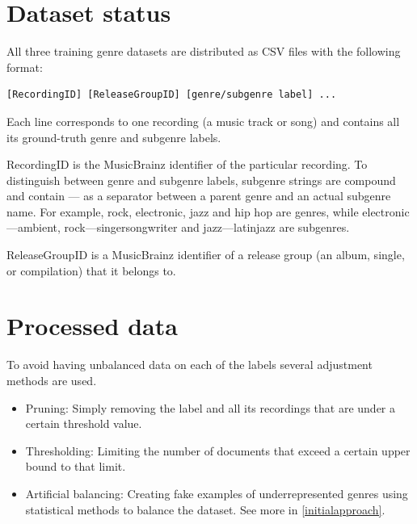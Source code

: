 
\section{Dataset status}

All three training genre datasets are distributed as CSV files with the following format:

\begin{lstlisting}[caption=CSV Ground Truth]
[RecordingID] [ReleaseGroupID] [genre/subgenre label] ...
\end{lstlisting}

Each line corresponds to one recording (a music track or song) and contains all its ground-truth genre and subgenre labels. 

RecordingID is the MusicBrainz identifier of the particular recording. 
To distinguish between genre and subgenre labels, subgenre strings are compound and contain --- as a separator between a parent genre and an actual subgenre name. 
For example, rock, electronic, jazz and hip hop are genres, 
while electronic---ambient, rock---singersongwriter and jazz---latinjazz are subgenres.

ReleaseGroupID is a MusicBrainz identifier of a release group (an album, single, or compilation) that it belongs to. 


\section{Processed data}

To avoid having unbalanced data on each of the labels several adjustment methods are used.

\begin{itemize}
    \item Pruning: Simply removing the label and all its recordings that are under a certain threshold value.
    \item Thresholding: Limiting the number of documents that exceed a certain upper bound to that limit.
    \item Artificial balancing: Creating fake examples of underrepresented genres using statistical methods to balance the dataset. See more in \ref{initialapproach}. 
\end{itemize}



